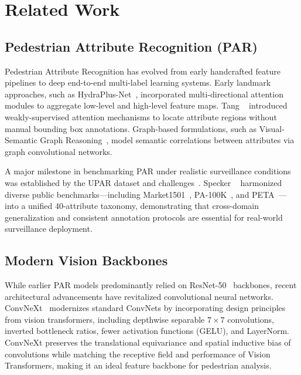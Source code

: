 \section{Related Work}
\label{sec:related}

\subsection{Pedestrian Attribute Recognition (PAR)}
Pedestrian Attribute Recognition has evolved from early handcrafted feature pipelines to deep end-to-end multi-label learning systems. Early landmark approaches, such as HydraPlus-Net~\cite{liu2017hydraplus}, incorporated multi-directional attention modules to aggregate low-level and high-level feature maps. Tang \etal~\cite{tang2019improving} introduced weakly-supervised attention mechanisms to locate attribute regions without manual bounding box annotations. Graph-based formulations, such as Visual-Semantic Graph Reasoning~\cite{li2019visual}, model semantic correlations between attributes via graph convolutional networks.

A major milestone in benchmarking PAR under realistic surveillance conditions was established by the UPAR dataset and challenges~\cite{specker2023upar,cormier2023upar,cormier2024upar}. Specker \etal~\cite{specker2023upar} harmonized diverse public benchmarks---including Market1501~\cite{zheng2015scalable}, PA-100K~\cite{liu2017hydraplus}, and PETA~\cite{deng2014pedestrian}---into a unified 40-attribute taxonomy, demonstrating that cross-domain generalization and consistent annotation protocols are essential for real-world surveillance deployment.

\subsection{Modern Vision Backbones}
While earlier PAR models predominantly relied on ResNet-50~\cite{he2016deep} backbones, recent architectural advancements have revitalized convolutional neural networks. ConvNeXt~\cite{liu2022convnet} modernizes standard ConvNets by incorporating design principles from vision transformers, including depthwise separable $7 \times 7$ convolutions, inverted bottleneck ratios, fewer activation functions (GELU), and LayerNorm. ConvNeXt preserves the translational equivariance and spatial inductive bias of convolutions while matching the receptive field and performance of Vision Transformers, making it an ideal feature backbone for pedestrian analysis.

